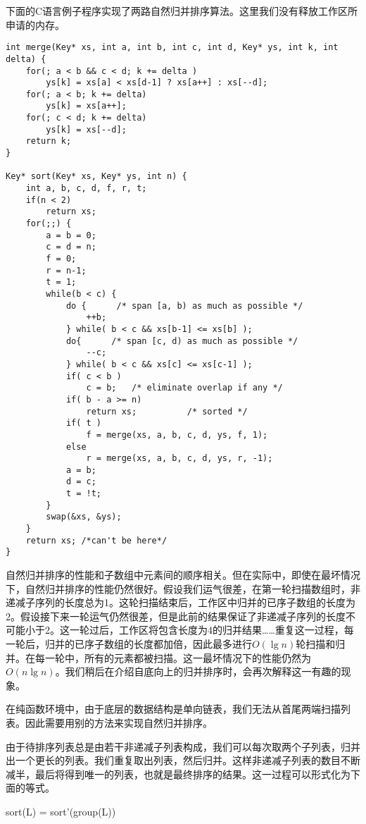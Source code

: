 \documentclass[UTF8]{article}
\begin{document}
下面的C语言例子程序实现了两路自然归并排序算法。这里我们没有释放工作区所申请的内存。

\lstset{language=C}
\begin{lstlisting}
int merge(Key* xs, int a, int b, int c, int d, Key* ys, int k, int delta) {
    for(; a < b && c < d; k += delta )
        ys[k] = xs[a] < xs[d-1] ? xs[a++] : xs[--d];
    for(; a < b; k += delta)
        ys[k] = xs[a++];
    for(; c < d; k += delta)
        ys[k] = xs[--d];
    return k;
}

Key* sort(Key* xs, Key* ys, int n) {
    int a, b, c, d, f, r, t;
    if(n < 2)
        return xs;
    for(;;) {
        a = b = 0;
        c = d = n;
        f = 0;
        r = n-1;
        t = 1;
        while(b < c) {
            do {      /* span [a, b) as much as possible */
                ++b;
            } while( b < c && xs[b-1] <= xs[b] );
            do{      /* span [c, d) as much as possible */
                --c;
            } while( b < c && xs[c] <= xs[c-1] );
            if( c < b )
                c = b;   /* eliminate overlap if any */
            if( b - a >= n)
                return xs;          /* sorted */
            if( t )
                f = merge(xs, a, b, c, d, ys, f, 1);
            else
                r = merge(xs, a, b, c, d, ys, r, -1);
            a = b;
            d = c;
            t = !t;
        }
        swap(&xs, &ys);
    }
    return xs; /*can't be here*/
}
\end{lstlisting}

自然归并排序的性能和子数组中元素间的顺序相关。但在实际中，即使在最坏情况下，自然归并排序的性能仍然很好。假设我们运气很差，在第一轮扫描数组时，非递减子序列的长度总为1。这轮扫描结束后，工作区中归并的已序子数组的长度为2。假设接下来一轮运气仍然很差，但是此前的结果保证了非递减子序列的长度不可能小于2。这一轮过后，工作区将包含长度为4的归并结果……重复这一过程，每一轮后，归并的已序子数组的长度都加倍，因此最多进行$O(\lg n)$轮扫描和归并。在每一轮中，所有的元素都被扫描。这一最坏情况下的性能仍然为$O(n \lg n)$。我们稍后在介绍自底向上的归并排序时，会再次解释这一有趣的现象。

在纯函数环境中，由于底层的数据结构是单向链表，我们无法从首尾两端扫描列表。因此需要用别的方法来实现自然归并排序。

由于待排序列表总是由若干非递减子列表构成，我们可以每次取两个子列表，归并出一个更长的列表。我们重复取出列表，然后归并。这样非递减子列表的数目不断减半，最后将得到唯一的列表，也就是最终排序的结果。这一过程可以形式化为下面的等式。

\be
sort(L) = sort'(group(L))
\ee
\end{document}

